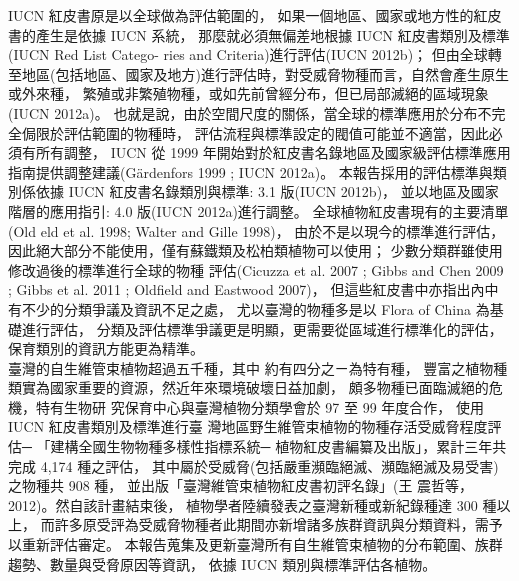 \begin{multicols}{2}
IUCN 紅皮書原是以全球做為評估範圍的， 如果一個地區、國家或地方性的紅皮書的產生是依據 IUCN 系統，
那麼就必須無偏差地根據 IUCN 紅皮書類別及標準(IUCN Red List Catego- ries and Criteria)進行評估(IUCN 2012b)；
但由全球轉至地區(包括地區、國家及地方)進行評估時，對受威脅物種而言，自然會產生原生或外來種，
繁殖或非繁殖物種，或如先前曾經分布，但已局部滅絕的區域現象(IUCN 2012a)。
也就是說，由於空間尺度的關係，當全球的標準應用於分布不完全侷限於評估範圍的物種時，
評估流程與標準設定的閥值可能並不適當，因此必須有所有調整，
IUCN 從 1999 年開始對於紅皮書名錄地區及國家級評估標準應用指南提供調整建議(Gärdenfors 1999 ; IUCN 2012a)。
本報告採用的評估標準與類別係依據 IUCN 紅皮書名錄類別與標準: 3.1 版(IUCN 2012b)，
並以地區及國家階層的應用指引: 4.0 版(IUCN 2012a)進行調整。
全球植物紅皮書現有的主要清單(Old eld et al. 1998; Walter and Gille  1998)，
由於不是以現今的標準進行評估，因此絕大部分不能使用，僅有蘇鐵類及松柏類植物可以使用；
少數分類群雖使用修改過後的標準進行全球的物種 評估(Cicuzza et al. 2007 ; Gibbs and Chen
2009 ; Gibbs et al. 2011 ; Oldfield and Eastwood 2007)，
但這些紅皮書中亦指出內中有不少的分類爭議及資訊不足之處，
尤以臺灣的物種多是以 Flora of China 為基礎進行評估，
分類及評估標準爭議更是明顯，更需要從區域進行標準化的評估，保育類別的資訊方能更為精準。\\

臺灣的自生維管束植物超過五千種，其中 約有四分之ㄧ為特有種，
豐富之植物種類實為國家重要的資源，然近年來環境破壞日益加劇，
頗多物種已面臨滅絕的危機，特有生物研 究保育中心與臺灣植物分類學會於 97 至 99 年度合作，
使用 IUCN 紅皮書類別及標準進行臺 灣地區野生維管束植物的物種存活受威脅程度評估─
「建構全國生物物種多樣性指標系統─ 植物紅皮書編纂及出版」，累計三年共完成 4,174 種之評估，
其中屬於受威脅(包括嚴重瀕臨絕滅、瀕臨絕滅及易受害)之物種共 908 種，
並出版「臺灣維管束植物紅皮書初評名錄」(王 震哲等，2012)。然自該計畫結束後，
植物學者陸續發表之臺灣新種或新紀錄種達 300 種以 上，
而許多原受評為受威脅物種者此期間亦新增諸多族群資訊與分類資料，需予以重新評估審定。
本報告蒐集及更新臺灣所有自生維管束植物的分布範圍、族群趨勢、數量與受脅原因等資訊，
依據 IUCN 類別與標準評估各植物。\\
\end{multicols}



